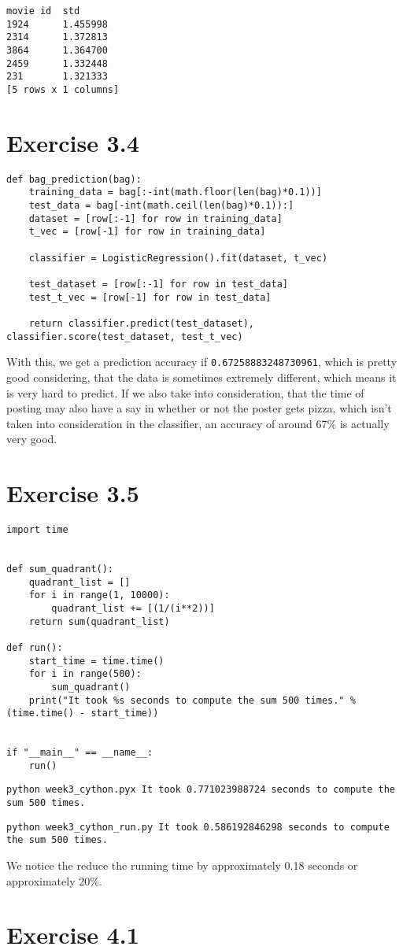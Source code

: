 \documentclass{article}
\begin{document}
\begin{verbatim}
movie id  std
1924      1.455998
2314      1.372813
3864      1.364700
2459      1.332448
231       1.321333
[5 rows x 1 columns]
\end{verbatim}

\section{Exercise 3.4}

\begin{lstlisting}
def bag_prediction(bag):
    training_data = bag[:-int(math.floor(len(bag)*0.1))]
    test_data = bag[-int(math.ceil(len(bag)*0.1)):]
    dataset = [row[:-1] for row in training_data]
    t_vec = [row[-1] for row in training_data]

    classifier = LogisticRegression().fit(dataset, t_vec)

    test_dataset = [row[:-1] for row in test_data]
    test_t_vec = [row[-1] for row in test_data]

    return classifier.predict(test_dataset), classifier.score(test_dataset, test_t_vec)
\end{lstlisting}

With this, we get a prediction accuracy if \texttt{0.67258883248730961}, which is pretty good considering, that the data is sometimes extremely different, which means it is very hard to predict. If we also take into consideration, that the time of posting may also have a say in whether or not the poster gets pizza, which isn't taken into consideration in the classifier, an accuracy of around 67\% is actually very good.

\section{Exercise 3.5}

\begin{lstlisting}
import time


def sum_quadrant():
    quadrant_list = []
    for i in range(1, 10000):
        quadrant_list += [(1/(i**2))]
    return sum(quadrant_list)

def run():
    start_time = time.time()
    for i in range(500):
        sum_quadrant()
    print("It took %s seconds to compute the sum 500 times." % (time.time() - start_time))


if "__main__" == __name__:
    run()
\end{lstlisting}

\texttt{python week3\_cython.pyx It took 0.771023988724 seconds to compute the sum 500 times.}

\texttt{python week3\_cython\_run.py
It took 0.586192846298 seconds to compute the sum 500 times.}

We notice the reduce the running time by approximately 0.18 seconds or approximately 20\%.

\section{Exercise 4.1}
\end{document}
